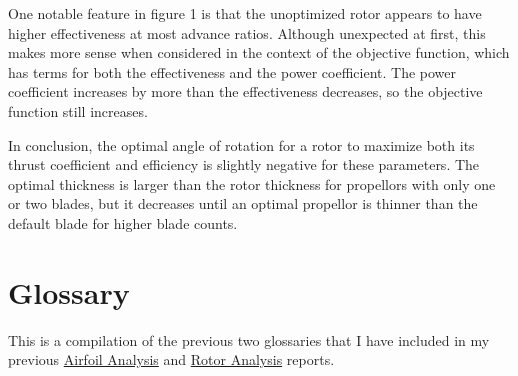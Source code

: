 \documentclass{article}
\begin{document}
One notable feature in figure 1 is that the unoptimized rotor appears to have higher effectiveness at most advance ratios. Although unexpected at first, this makes more sense when considered in the context of the objective function, which has terms for both the effectiveness and the power coefficient. The power coefficient increases by more than the effectiveness decreases, so the objective function still increases. \newline

In conclusion, the optimal angle of rotation for a rotor to maximize both its thrust coefficient and efficiency is slightly negative for these parameters. The optimal thickness is larger than the rotor thickness for propellors with only one or two blades, but it decreases until an optimal propellor is thinner than the default blade for higher blade counts.

\clearpage

\section{Glossary}

This is a compilation of the previous two glossaries that I have included in my previous \href{https://github.com/JoeSpencer1/497R-Projects/blob/Rotor-Analysis/Airfoil Analysis/Airfoil_Analysis.pdf}{Airfoil Analysis} and \href{https://github.com/JoeSpencer1/497R-Projects/blob/Rotor-Analysis/Rotor Analysis/Rotor_Analysis.pdf}{Rotor Analysis} reports.
\end{document}
